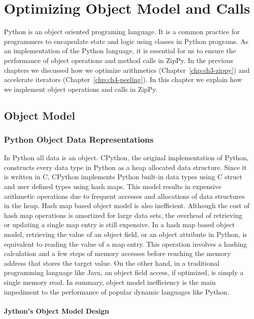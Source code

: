 \chapter{Optimizing Object Model and Calls}
\label{chp:ch5-object}

Python is an object oriented programing language.
It is a common practice for programmers to encapsulate state and logic using classes in Python programs.
As an implementation of the Python language, it is essential for us to ensure the performance of object operations and method calls in ZipPy.
In the previous chapters we discussed how we optimize arithmetics (Chapter~\ref{chp:ch3-zippy}) and accelerate iterators (Chapter~\ref{chp:ch4-peeling}).
In this chapter we explain how we implement object operations and calls in ZipPy.

\section{Object Model}
\label{sec:ch5-object-module}

\subsection{Python Object Data Representations}

In Python all data is an object.
CPython, the original implementation of Python, constructs every data type in Python as a heap allocated data structure.
Since it is written in C, CPython implements Python built-in data types using C struct and user defined types using hash maps.
This model results in expensive arithmetic operations due to frequent accesses and allocations of data structures in the heap.
Hash map based object model is also inefficient.
Although the cost of hash map operations is amortized for large data sets, the overhead of retrieving or updating a single map entry is still expensive.
In a hash map based object model, retrieving the value of an object field, or an object attribute in Python, is equivalent to reading the value of a map entry.
This operation involves a hashing calculation and a few steps of memory accesses before reaching the memory address that stores the target value.
On the other hand, in a traditional programming language like Java, an object field access, if optimized, is simply a single memory read.
In summary, object model inefficiency is the main impediment to the performance of popular dynamic languages like Python.

\subsubsection{Jython's Object Model Design}


